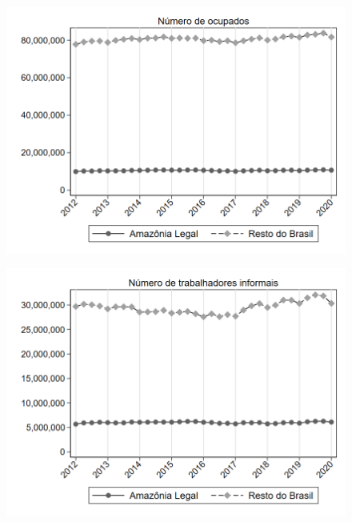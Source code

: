 \begin{frame}[label=_estrutura_emprego_n_de_ocupacao]{}
\textit{\hyperlink{_estrutura_emprego}{}}
\begin{figure}
  \centering
  \includegraphics[width=1\linewidth]{../../analysis/output/estrutura_emprego/_estrutura_emprego_n_de_ocupacao.png}
  \caption{}
  \label{fig:_estrutura_emprego_n_de_ocupacao}
\end{figure}
\end{frame}

\begin{frame}[label=_estrutura_emprego_n_de_informalidade]{}
\textit{\hyperlink{_estrutura_emprego}{}}
\begin{figure}
  \centering
  \includegraphics[width=1.0\linewidth]{../../analysis/output/estrutura_emprego/_estrutura_emprego_n_de_informalidade.png}
  \caption{}
  \label{fig:_estrutura_emprego_n_de_informalidade}
\end{figure}
\end{frame}

